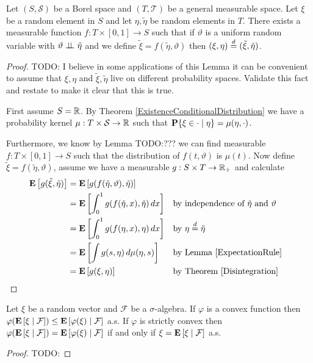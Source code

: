 \begin{lem}Let $(S, \mathcal{S})$ be a Borel space and $(T, \mathcal{T})$ be 
  a general measurable space.  Let $\xi$ be a random element in $S$
  and let $\eta, \tilde{\eta}$ be random elements in $T$.  There
  exists a measurable function $f : T \times [0,1] \to S$ such that if
  $\vartheta$ is a uniform random variable with
  $\cindependent{\vartheta}{\tilde{\eta}}{}$ and we define
  $\tilde{\xi} = f(\tilde{\eta}, \vartheta)$ then $(\xi, \eta) \eqdist
  (\tilde{\xi}, \tilde{\eta})$.
\end{lem}
\begin{proof}
TODO: I believe in some applications of this Lemma it can be
convenient to assume that $\xi, \eta$ and $\tilde{\xi}, \tilde{\eta}$
live on different probability spaces.  Validate this fact and restate
to make it clear that this is true.

First assume $S = \reals$.  By Theorem
\ref{ExistenceConditionalDistribution} we have a probability kernel
$\mu : T \times \mathcal{S} \to \reals$ such that
$\cprobability{\eta}{\xi \in \cdot} = \mu(\eta, \cdot)$.  

Furthermore, we know by Lemma TODO:???  we can find measurable $f : T
\times [0,1] \to S$ such that the distribution of $f(t, \vartheta)$ is
$\mu(t)$.  Now define $\tilde{\xi} = f(\tilde{\eta}, \vartheta)$,
assume we have a measurable $g : S \times T \to \reals_+$ and
calculate
\begin{align*}
\expectation{g(\tilde{\xi}, \tilde{\eta})} &=
\expectation{g(f(\tilde{\eta}, \vartheta), \tilde{\eta})} \\
&= \expectation{\int_0^1 g(f(\tilde{\eta},x), \tilde{\eta}) \, dx} & &
\text{by independence of $\tilde{\eta}$ and $\vartheta$}\\
&= \expectation{\int_0^1 g(f(\eta,x), \eta) \, dx} & &
\text{by $\eta \eqdist \tilde{\eta}$}\\
&= \expectation{\int g(s, \eta) \, d\mu(\eta,s)} & & \text{by
  Lemma \ref{ExpectationRule}} \\
&= \expectation{g(\xi, \eta)} & & \text{by Theorem \ref{Disintegration}}
\end{align*}
\end{proof}

\begin{thm}\label{JensenConditionalExpectation}Let $\xi$ be a random vector and $\mathcal{F}$ be a
  $\sigma$-algebra.  If $\varphi$ is a convex function then
  $\varphi(\cexpectationlong{\mathcal{F}}{\xi}) \leq
    \cexpectationlong{\mathcal{F}}{\varphi(\xi)}$ a.s.
If $\varphi$ is strictly convex then $\varphi(\cexpectationlong{\mathcal{F}}{\xi}) =
    \cexpectationlong{\mathcal{F}}{\varphi(\xi)}$ if and only if $\xi =
      \cexpectationlong{\mathcal{F}}{\xi}$ a.s.
\end{thm}
\begin{proof}
TODO:
\end{proof}
